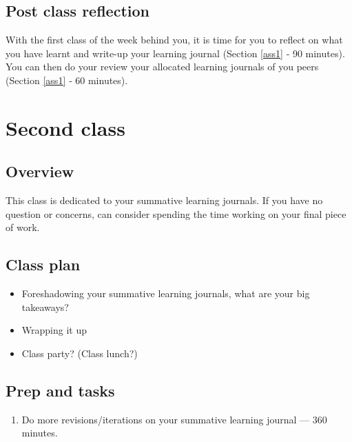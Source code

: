 \documentclass[]{book}
\providecommand{\tightlist}{%
  \setlength{\itemsep}{0pt}\setlength{\parskip}{0pt}}
\theoremstyle{definition}
\theoremstyle{definition}
\theoremstyle{definition}
\theoremstyle{remark}
\begin{document}
\hypertarget{post-class-reflection-10}{%
\subsection{Post class reflection}\label{post-class-reflection-10}}

With the first class of the week behind you, it is time for you to
reflect on what you have learnt and write-up your learning journal
(Section \ref{ass1} ‐ 90 minutes). You can then do your review your
allocated learning journals of you peers (Section \ref{ass1} ‐ 60
minutes).

\hypertarget{second-class-5}{%
\section*{Second class}\label{second-class-5}}

\hypertarget{overview-11}{%
\subsection*{Overview}\label{overview-11}}

This class is dedicated to your summative learning journals. If you have
no question or concerns, can consider spending the time working on your
final piece of work.

\hypertarget{class-plan-11}{%
\subsection*{Class plan}\label{class-plan-11}}

\begin{itemize}
\item
  Foreshadowing your summative learning journals, what are your big
  takeaways?
\item
  Wrapping it up
\item
  Class party? (Class lunch?)
\end{itemize}

\hypertarget{prep-and-tasks-11}{%
\subsection*{Prep and tasks}\label{prep-and-tasks-11}}

\begin{enumerate}
\def\labelenumi{\arabic{enumi}.}
\tightlist
\item
  Do more revisions/iterations on your summative learning journal ---
  360 minutes.
\end{enumerate}
\end{document}
